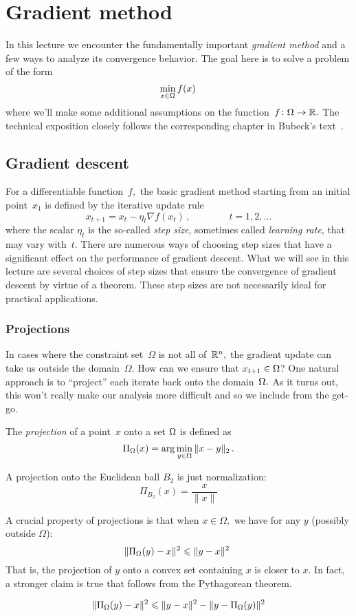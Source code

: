 \section{Gradient method}

In this lecture we encounter the fundamentally important \emph{gradient method}
and a few ways to analyze its convergence behavior.
The goal here is to solve a problem of the form
\[
\min_{x\in\Omega} f(x)\,
\]
where we'll make some additional assumptions on the
function~$f\colon\Omega\to\mathbb{R}.$ The technical exposition closely follows the
corresponding chapter in Bubeck's text~\cite{Bubeck}.

\subsection{Gradient descent}

For a differentiable function~$f,$ the basic gradient method starting from an
initial point~$x_1$ is defined by the iterative update rule
\[
x_{t+1} = x_t - \eta_t \nabla f(x_t)\,,\qquad\qquad t=1,2,\dots
\]
where the scalar $\eta_t$ is the so-called \emph{step size}, sometimes called
\emph{learning rate}, that may vary with~$t.$ There are numerous ways of
choosing step sizes that have a significant effect on the performance of
gradient descent. What we will see in this lecture are several choices of step
sizes that ensure the convergence of gradient descent by virtue of a theorem.
These step sizes are not necessarily ideal for practical applications.

\subsubsection{Projections}

In cases where the constraint set~$\Omega$ is not all of~$\mathbb{R}^n,$ the gradient
update can take us outside the domain~$\Omega.$ How can we
ensure that $x_{t+1}\in\Omega$?  One natural approach is to ``project'' each
iterate back onto the domain~$\Omega.$ As it turns out, this won't really make
our analysis more difficult and so we include from the get-go.

\begin{definition}[Projection]
The \emph{projection} of a point~$x$ onto a set $\Omega$ is defined as
\[
\Pi_{\Omega}(x) = \arg\min_{y\in\Omega} \|x-y\|_2\,.
\]
\end{definition}

\begin{example}
A projection onto the Euclidean ball $B_2$ is just normalization:
\[
\Pi_{B_2}(x) = \dfrac{x}{\|x\|}
\]
\end{example}
%
A crucial property of projections is that when $x\in\Omega,$ we have for any $y$
(possibly outside $\Omega$):
\[
\| \Pi_{\Omega}(y) - x \|^2 \leqslant \| y - x \|^2\
\]
That is, the projection of $y$ onto a convex set containing $x$ is closer to
$x$. In fact, a stronger claim is true that follows from the
Pythagorean theorem.
%
\begin{lemma}
\[
\| \Pi_{\Omega}(y) - x \|^2 \leqslant \| y - x \|^2 - \| y - \Pi_{\Omega}(y) \|^2
\]
\end{lemma}


